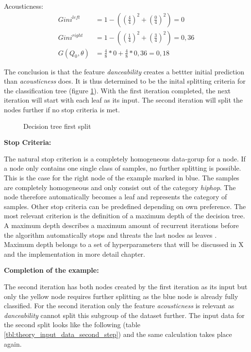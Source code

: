 Acousticness: 
\begin{equation*}
    \begin{aligned}
        Gini^{left}  &= 1 - ((\frac{4}{4})^2 + (\frac{0}{4})^2) = 0
        \\
        Gini^{right} &= 1 - ((\frac{1}{4})^2 + (\frac{3}{4})^2) = 0,36
        \\
        G(Q_{0},\theta) &= \frac{4}{8} * 0 + \frac{4}{8} * 0,36 = 0,18
    \end{aligned}
\end{equation*}

The conclusion is that the feature \emph{danceability} creates a bettter initial prediction than \emph{acousticness} does. It is thus 
determined to be the inital splitting criteria for the classification tree (figure \ref{fig:theory_first_split}). With the first iteration completed, the next iteration
will start with each leaf as its input. The second iteration will split the nodes further if no stop criteria is met. 

\begin{figure}[H]
    \centering
    \qquad
    \caption{Decision tree first split}%
    \label{fig:theory_first_split}%
\end{figure}

\textbf{Stop Criteria:}

The natural stop criterion is a completely homogeneous data-gorup for a node. If a node only contains one single 
class of samples, no further splitting is possible. This is the case for the right node of the example marked in blue. The samples are completely
homogeneous and only consist out of the category \emph{hiphop}. The node therefore automatically becomes a leaf and represents the 
category of samples. Other stop criteria can be predefined depending on own preference. The most relevant criterion is the 
definition of a maximum depth of the decision tree. A maximum depth describes a maximum amount of recurrent iterations before 
the algorithm automatically stops and threats the last nodes as leaves \cite[p.7]{lewis2000introduction}. Maximum depth belongs to a set of hyperparameters that
will be discussed in X and the implementation in more detail chapter. 

\textbf{Completion of the example:}

The second iteration has both nodes created by the first iteration as its input but only the yellow node requires further splitting as 
the blue node is already fully classified. For the second iteration only the feature \emph{acousticness} is relevant as \emph{danceability} cannot 
split this subgroup of the dataset further. The input data for the second split looks like the following (table \ref{tbl:theory_input_data_second_step}) and the same calculation 
takes place again. 

